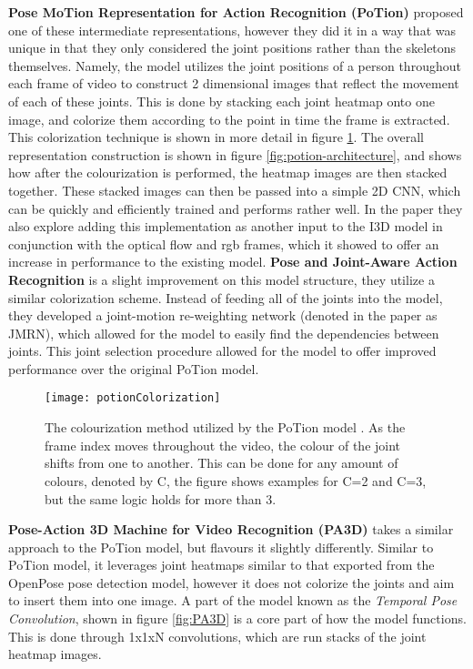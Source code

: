 \textbf{Pose MoTion Representation for Action Recognition (PoTion)} \cite{potion} proposed one of these intermediate representations, however they did it in a way that was unique in that they only considered the joint positions rather than the skeletons themselves. Namely, the model utilizes the joint positions of a person throughout each frame of video to construct 2 dimensional images that reflect the movement of each of these joints. This is done by stacking each joint heatmap onto one image, and colorize them according to the point in time the frame is extracted. This colorization technique is shown in more detail in figure \ref{fig:potion-colourization}. The overall representation construction is shown in figure \ref{fig:potion-architecture}, and shows how after the colourization is performed, the heatmap images are then stacked together. These stacked images can then be passed into a simple 2D CNN, which can be quickly and efficiently trained and performs rather well. In the paper they also explore adding this implementation as another input to the I3D \cite{i3d} model in conjunction with the optical flow and rgb frames, which it showed to offer an increase in performance to the existing model. \textbf{Pose and Joint-Aware Action Recognition} \cite{poseandjointaware} is a slight improvement on this model structure, they utilize a similar colorization scheme. Instead of feeding all of the joints into the model, they developed a joint-motion re-weighting network (denoted in the paper as JMRN), which allowed for the model to easily find the dependencies between joints. This joint selection procedure allowed for the model to offer improved performance over the original PoTion model.

\begin{figure}[ht]
	\texttt{[image: potionColorization]}
	\centering
	\caption{The colourization method utilized by the PoTion model \cite{potion}. As the frame index moves throughout the video, the colour of the joint shifts from one to another. This can be done for any amount of colours, denoted by C, the figure shows examples for C=2 and C=3, but the same logic holds for more than 3.}
	\label{fig:potion-colourization}
\end{figure}

\textbf{Pose-Action 3D Machine for Video Recognition (PA3D)} \cite{PA3D} takes a similar approach to the PoTion model, but flavours it slightly differently. Similar to PoTion model, it leverages joint heatmaps similar to that exported from the OpenPose pose detection model, however it does not colorize the joints and aim to insert them into one image. A part of the model known as the \textit{Temporal Pose Convolution}, shown in figure \ref{fig:PA3D} is a core part of how the model functions. This is done through 1x1xN convolutions, which are run stacks of the joint heatmap images.

